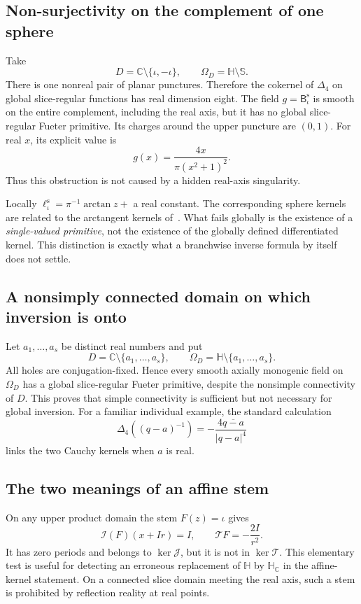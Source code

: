 \documentclass[11pt,a4paper]{article}
\numberwithin{equation}{section}
\theoremstyle{definition}
\theoremstyle{remark}
\newcommand{\C}{\mathbb C}
\newcommand{\HH}{\mathbb H}
\newcommand{\HC}{\mathbb H_{\C}}
\newcommand{\Sph}{\mathbb S}
\newcommand{\T}{\mathcal T}
\newcommand{\J}{\mathcal J}
\newcommand{\Lap}{\Delta_4}
\newcommand{\ind}{\mathcal I}
\newcommand{\Bsym}{\mathsf B^{\mathrm s}}
\begin{document}
\subsection{Non-surjectivity on the complement of one sphere}
Take
\[
 D=\C\setminus\{\iota,-\iota\},\qquad
 \Omega_D=\HH\setminus\Sph.
\]
There is one nonreal pair of planar punctures. Therefore the cokernel
of $\Lap$ on global slice-regular functions has real dimension eight.
The field $g=\Bsym_\iota$ is smooth on the entire complement, including
the real axis, but it has no global slice-regular Fueter primitive.
Its charges around the upper puncture are $(0,1)$.
For real $x$, its explicit value is
\begin{equation}
 g(x)=\frac{4x}{\pi(x^2+1)^2}.
 \label{eq:sphere-example}
\end{equation}
Thus this obstruction is not caused by a hidden real-axis singularity.

Locally $\ell^{\mathrm s}_\iota=\pi^{-1}\arctan z+$ a real constant.
The corresponding sphere kernels are related to the arctangent kernels
of~\cite{CSS}. What fails globally is the existence of a
\emph{single-valued primitive}, not the existence of the globally
defined differentiated kernel. This distinction is exactly what a
branchwise inverse formula by itself does not settle.

\subsection{A nonsimply connected domain on which inversion is onto}
Let $a_1,\ldots,a_s$ be distinct real numbers and put
\[
 D=\C\setminus\{a_1,\ldots,a_s\},\qquad
 \Omega_D=\HH\setminus\{a_1,\ldots,a_s\}.
\]
All holes are conjugation-fixed. Hence every smooth axially monogenic
field on $\Omega_D$ has a global slice-regular Fueter primitive,
despite the nonsimple connectivity of $D$. This proves that simple
connectivity is sufficient but not necessary for global inversion.
For a familiar individual example, the standard calculation
\[
 \Lap((q-a)^{-1})=-\frac{4\overline{q-a}}{|q-a|^4}
\]
links the two Cauchy kernels when $a$ is real.

\subsection{The two meanings of an affine stem}
On any upper product domain the stem $F(z)=\iota$ gives
\[
 \ind(F)(x+Ir)=I,\qquad\T F=-\frac{2I}{r^2}.
\]
It has zero periods and belongs to $\ker\J$, but it is not in $\ker\T$.
This elementary test is useful for detecting an erroneous replacement
of $\HH$ by $\HC$ in the affine-kernel statement. On a connected
slice domain meeting the real axis, such a stem is prohibited by
reflection reality at real points.
\end{document}
